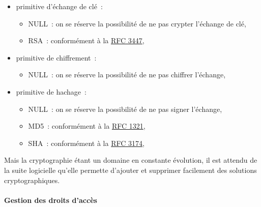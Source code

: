 \begin{itemize}
	\item primitive d'échange de clé~:
	\begin{itemize}
		\item NULL~: on se réserve la possibilité de ne pas crypter l'échange de clé,
		\item RSA~: conformément à la \href{http://tools.ietf.org/html/rfc3447}{RFC 3447},
	\end{itemize}
	\item primitive de chiffrement~:
	\begin{itemize}
		\item NULL~: on se réserve la possibilité de ne pas chiffrer l'échange,
	\end{itemize}
	\item primitive de hachage~:
	\begin{itemize}
		\item NULL~: on se réserve la possibilité de ne pas signer l'échange,
		\item MD5~: conformément à la \href{http://tools.ietf.org/html/rfc1321}{RFC 1321},
		\item SHA~: conformément à la \href{http://tools.ietf.org/html/rfc3174}{RFC 3174},
	\end{itemize}
\end{itemize} 
Mais la cryptographie étant un domaine en constante évolution, il est attendu de la suite logicielle qu'elle permette d'ajouter et supprimer facilement des solutions cryptographiques. 

\paragraph{Gestion des droits d'accès}

